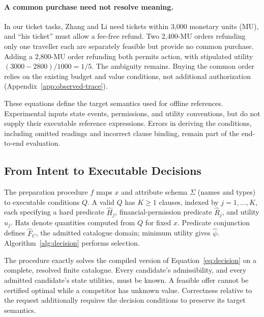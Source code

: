 \paragraph{A common purchase need not resolve meaning.}
In our ticket tasks, Zhang and Li need tickets within 3,000 monetary units (MU), and ``his ticket'' must allow a fee-free refund. Two 2,400-MU orders refunding only one traveller each are separately feasible but provide no common purchase. Adding a 2,800-MU order refunding both permits action, with stipulated utility $(3000-2800)/1000=1/5$. The ambiguity remains. Buying the common order relies on the existing budget and value conditions, not additional authorization (Appendix~\ref{app:observed-trace}).

These equations define the target semantics used for offline references. Experimental inputs state events, permissions, and utility conventions, but do not supply their executable reference expressions. Errors in deriving the conditions, including omitted readings and incorrect clause binding, remain part of the end-to-end evaluation.

\subsection{From Intent to Executable Decisions}
\label{sec:realization}
\label{sec:contracts}
\label{sec:intent-dsl}
The preparation procedure $f$ maps $x$ and attribute schema $\Sigma$ (names and types) to executable conditions $Q$. A valid $Q$ has $K\ge1$ clauses, indexed by $j=1,\ldots,K$, each specifying a hard predicate $\widehat H_j$, financial-permission predicate $\widehat R_j$, and utility $\widehat u_j$. Hats denote quantities computed from $Q$ for fixed $x$. Predicate conjunction defines $\widehat F_C$, the admitted catalogue domain; minimum utility gives $\widehat\psi$. Algorithm~\ref{alg:decision} performs selection.

The procedure exactly solves the compiled version of Equation~\eqref{eq:decision} on a complete, resolved finite catalogue. Every candidate's admissibility, and every admitted candidate's state utilities, must be known. A feasible offer cannot be certified optimal while a competitor has unknown value. Correctness relative to the request additionally requires the decision conditions to preserve its target semantics.

